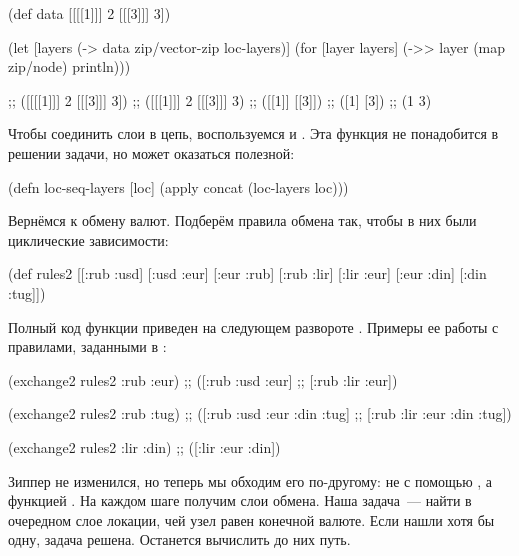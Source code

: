 \begin{english}
  \begin{clojure}
(def data [[[[1]]] 2 [[[3]]] 3])

(let [layers (-> data
                 zip/vector-zip
                 loc-layers)]
  (for [layer layers]
    (->> layer
         (map zip/node)
         println)))

;; ([[[[1]]] 2 [[[3]]] 3])
;; ([[[1]]] 2 [[[3]]] 3)
;; ([[1]] [[3]])
;; ([1] [3])
;; (1 3)
  \end{clojure}
\end{english}

Чтобы соединить слои в цепь, воспользуемся  и . Эта функция не
понадобится в решении задачи, но может оказаться полезной:

\begin{english}
  \begin{clojure}
(defn loc-seq-layers [loc]
  (apply concat (loc-layers loc)))
  \end{clojure}
\end{english}

Вернёмся к обмену валют. Подберём правила обмена так, чтобы в них были
циклические зависимости:

\begin{english}
  \begin{clojure}
(def rules2
  [[:rub :usd]
   [:usd :eur]
   [:eur :rub]
   [:rub :lir]
   [:lir :eur]
   [:eur :din]
   [:din :tug]])
  \end{clojure}
\end{english}

Полный код функции  приведен на следующем развороте
. Примеры ее работы с правилами, заданными в
:

\begin{english}
  \begin{clojure}
(exchange2 rules2 :rub :eur)
;; ([:rub :usd :eur]
;;  [:rub :lir :eur])

(exchange2 rules2 :rub :tug)
;; ([:rub :usd :eur :din :tug]
;;  [:rub :lir :eur :din :tug])

(exchange2 rules2 :lir :din)
;; ([:lir :eur :din])
  \end{clojure}
\end{english}

Зиппер не изменился, но теперь мы обходим его по-другому: не с помощью
, а функцией . На каждом шаге получим слои
обмена. Наша задача~--- найти в очередном слое локации, чей узел равен конечной
валюте. Если нашли хотя бы одну, задача решена. Останется вычислить до них путь.

